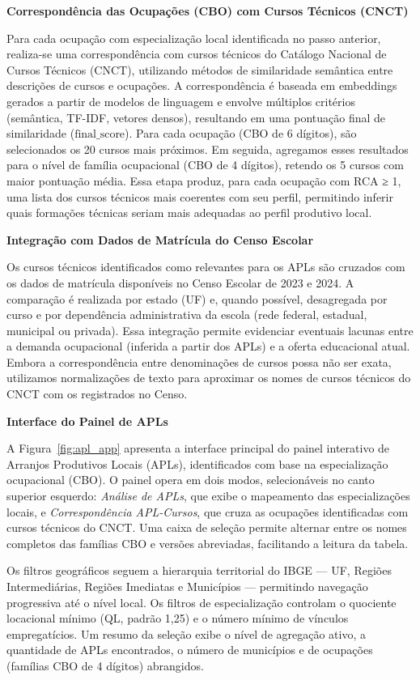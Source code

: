 \textbf{Correspondência das Ocupações (CBO) com Cursos Técnicos (CNCT)}

Para cada ocupação com especialização local identificada no passo anterior, realiza-se uma correspondência com cursos técnicos do Catálogo Nacional de Cursos Técnicos (CNCT), utilizando métodos de similaridade semântica entre descrições de cursos e ocupações.
 A correspondência é baseada em embeddings gerados a partir de modelos de linguagem e envolve múltiplos critérios (semântica, TF-IDF, vetores densos), resultando em uma pontuação final de similaridade ($\text{final\_score}$). Para cada ocupação (CBO de 6 dígitos), são selecionados os 20 cursos mais próximos. Em seguida, agregamos esses resultados para o nível de família ocupacional (CBO de 4 dígitos), retendo os 5 cursos com maior pontuação média. Essa etapa produz, para cada ocupação com RCA ≥ 1, uma lista dos cursos técnicos mais coerentes com seu perfil, permitindo inferir quais formações técnicas seriam mais adequadas ao perfil produtivo local.

\textbf{Integração com Dados de Matrícula do Censo Escolar}

Os cursos técnicos identificados como relevantes para os APLs são cruzados com os dados de matrícula disponíveis no Censo Escolar de 2023 e 2024. A comparação é realizada por estado (UF) e, quando possível, desagregada por curso e por dependência administrativa da escola (rede federal, estadual, municipal ou privada). Essa integração permite evidenciar eventuais lacunas entre a demanda ocupacional (inferida a partir dos APLs) e a oferta educacional atual. Embora a correspondência entre denominações de cursos possa não ser exata, utilizamos normalizações de texto para aproximar os nomes de cursos técnicos do CNCT com os registrados no Censo.



\textbf{Interface do Painel de APLs}

A Figura~\ref{fig:apl_app} apresenta a interface principal do painel interativo de Arranjos Produtivos Locais (APLs), identificados com base na especialização ocupacional (CBO). O painel opera em dois modos, selecionáveis no canto superior esquerdo: \emph{Análise de APLs}, que exibe o mapeamento das especializações locais, e \emph{Correspondência APL-Cursos}, que cruza as ocupações identificadas com cursos técnicos do CNCT. Uma caixa de seleção permite alternar entre os nomes completos das famílias CBO e versões abreviadas, facilitando a leitura da tabela.

Os filtros geográficos seguem a hierarquia territorial do IBGE — UF, Regiões Intermediárias, Regiões Imediatas e Municípios — permitindo navegação progressiva até o nível local. Os filtros de especialização controlam o quociente locacional mínimo (QL, padrão 1,25) e o número mínimo de vínculos empregatícios. Um resumo da seleção exibe o nível de agregação ativo, a quantidade de APLs encontrados, o número de municípios e de ocupações (famílias CBO de 4 dígitos) abrangidos.

